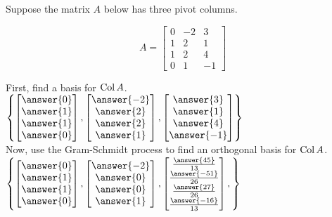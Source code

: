 \documentclass{ximera}
\newcommand{\Col}{\mathop{\rm Col}}
\begin{document}
  	  		                \begin{question} 
  	  		                	Suppose the matrix $A$ below has three pivot columns. 
  	  		                	
  	  		                	$$A = \begin{bmatrix}0&-2&3\\1&2&1\\1&2&4\\0&1&-1    \end{bmatrix}$$
  	  		                	
  	  		                	First, find a basis for $\Col A$.\vspace{10pt}\\
  	  		                	
  	  		                	$\left\{  	\begin{bmatrix} \answer{0}\\\answer{1}\\\answer{1}\\\answer{0}\end{bmatrix},  \begin{bmatrix} \answer{-2}\\\answer{2}\\\answer{2}\\\answer{1}\end{bmatrix} , \begin{bmatrix}\answer{3}\\\answer{1}\\\answer{4}\\\answer{-1}\end{bmatrix}    \right\}$\vspace{10pt}\\
  	  		                	
  	  		                	
  	  		               Now, use the Gram-Schmidt process to find an orthogonal basis for $\Col A$.\\
  	  		                	
  	  		                		$\left\{   \begin{bmatrix} \answer{0}\\\answer{1}\\\answer{1}\\\answer{0}\end{bmatrix}, 
  	  		                		\begin{bmatrix} \answer{-2}\\\answer{0}\\\answer{0}\\\answer{1}\end{bmatrix},  
  	  		                		\begin{bmatrix} \frac{\answer{45}}{13}\\\frac{\answer{-51}}{26}\\\frac{\answer{27}}{26}\\\frac{\answer{-16}}{13}\end{bmatrix},                        \right\}$
  	  		                	
  	  		                \end{question}
\end{document}

